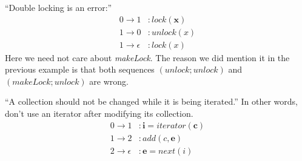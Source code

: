 \documentclass[a4paper]{article}
\theoremstyle{slanted}
\theoremstyle{definition}
\theoremstyle{remark}
\begin{document}
``Double locking is an error:''
\begin{equation}
\begin{aligned}
0\to1&: \mathit{lock}(\mathbf x)\\
1\to0&: \mathit{unlock}(x)\\
1\to\epsilon&: \mathit{lock}(x)
\end{aligned}
\end{equation}
Here we need not care about \textit{makeLock}.
The reason we did mention it in the previous example is that both sequences $(\mathit{unlock}; \mathit{unlock})$ and $(\mathit{makeLock}; \mathit{unlock})$ are wrong.

``A collection should not be changed while it is being iterated.''
In other words, don't use an iterator after modifying its collection.
\begin{equation}
\begin{aligned}
0\to1&: \mathbf{i} = \mathit{iterator}(\mathbf{c})\\
1\to2&: \mathit{add}(c, \mathbf{e}) \\
2\to\epsilon&: \mathbf{e} = \mathit{next}(i)
\end{aligned}
\end{equation}




\end{document}
